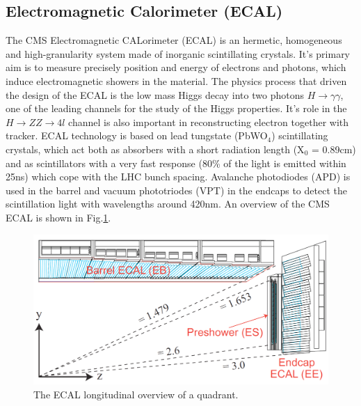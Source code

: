\subsection{Electromagnetic Calorimeter (ECAL)}
The CMS Electromagnetic CALorimeter (ECAL) \cite{ecal} is an hermetic, homogeneous and high-granularity system made of inorganic scintillating crystals. It's primary aim is to measure precisely position and energy of electrons and photons, which induce electromagnetic showers in the material. The physics process that driven the design of the ECAL is the low mass Higgs decay into two photons $H \rightarrow \gamma\gamma$, one of the leading channels for the study of the Higgs properties. It's role in the $H \rightarrow ZZ \rightarrow 4l$ channel is also important in reconstructing electron together with tracker. ECAL technology is based on lead tungstate (PbWO$_{4}$) scintillating crystals, which act both as absorbers with a short radiation length (X$_{0}$ = 0.89cm) and as scintillators with a very fast response (80\% of the light is emitted within 25ns) which cope with the LHC bunch spacing. Avalanche photodiodes (APD) is used in the barrel and vacuum phototriodes (VPT) in the endcaps to detect the scintillation light with wavelengths around 420nm. An overview of the CMS ECAL is shown in Fig.\ref{fig:ecal}.
\begin{figure}[h]
\centering
\includegraphics[scale=0.3]{fig/chapt3/img_ECALRapidity.png}
\caption{\label{fig:ecal} The ECAL longitudinal overview of a quadrant.}
\end{figure}
